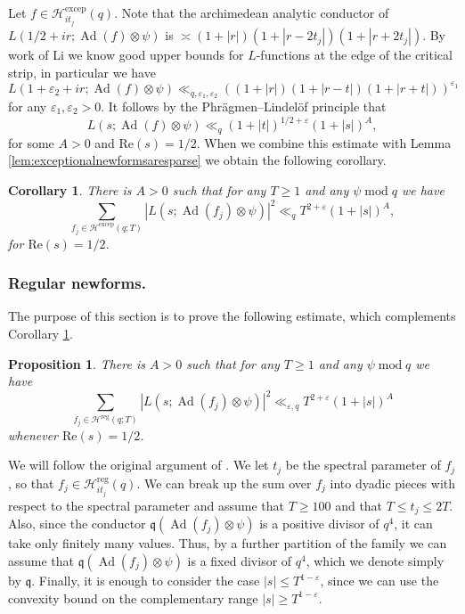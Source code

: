 \documentclass{article}
\newtheorem{prop}[thm]{Proposition}
\newtheorem{cor}[thm]{Corollary}
\theoremstyle{named}
\newcommand{\HH}{\mathcal{H}}
\newcommand{\q}{\mathfrak{q}}
\DeclareMathOperator{\Ad}{Ad}
\DeclareMathOperator{\modulo}{mod}
\begin{document}
Let $f \in \HH_{it_j}^{\text{excep}}(q)$. Note that the archimedean analytic conductor of $L(1/2 + ir; \Ad(f)\otimes \psi)$ is $\asymp (1 + |r|)(1 + |r - 2t_j|)(1 + |r + 2t_j|)$. By work of Li \cite{liupperboundedge} we know good upper bounds for $L$-functions at the edge of the critical strip, in particular we have
\begin{equation*}
    L(1 + \varepsilon_2 + ir; \Ad(f)\otimes \psi) \ll_{q, \varepsilon_1, \varepsilon_2} ((1 + |r|)(1 + |r - t|)(1 + |r + t|))^{\varepsilon_1}
\end{equation*}
for any $\varepsilon_1, \varepsilon_2 > 0$. It follows by the Phrägmen--Lindelöf principle that
\begin{equation*}
    L(s; \Ad(f)\otimes \psi) \ll_q (1 + |t|)^{1/2 + \varepsilon}(1 + |s|)^A,
\end{equation*}
for some $A > 0$ and $\text{Re}(s) = 1/2$. When we combine this estimate with Lemma \ref{lem:exceptionalnewformsaresparse} we obtain the following corollary.

\begin{cor}\label{cor:sumLfunctionsexceptional}
There is $A > 0$ such that for any $T \geq 1$ and any $\psi \modulo q$ we have
\begin{equation*}
    \sum_{f_j \in \HH^{\text{excep}}(q; T)} |L(s; \Ad(f_j)\otimes \psi)|^2 \ll_q T^{2 + \varepsilon} (1 + |s|)^A, 
\end{equation*}
for $\text{Re}(s) = 1/2$.
\end{cor}


\subsubsection{Regular newforms.}
The purpose of this section is to prove the following estimate, which complements Corollary \ref{cor:sumLfunctionsexceptional}. 
\begin{prop}\label{prop:lindelofforregularnewforms}
There is $A > 0$ such that for any $T \geq 1$ and any $\psi \modulo q$ we have
 \begin{equation*}
    \sum_{f_j \in \HH^{\text{reg}}(q; T)} |L(s; \Ad(f_j)\otimes \psi)|^2 \ll_{\varepsilon, q} T^{2+\varepsilon} (1 + |s|)^A
\end{equation*}
whenever $\text{Re}(s) = 1/2$.   
\end{prop}  
We will follow the original argument of \cite[Pages 220-221]{luosarnak}. We let $t_j$ be the spectral parameter of $f_j$, so that $f_j \in \HH^{\text{reg}}_{it_j}(q)$. We can break up the sum over $f_j$ into dyadic pieces with respect to the spectral parameter and assume that $T \geq 100$ and that $T \leq t_j \leq 2T$. Also, since the conductor $\q(\Ad(f_j) \otimes \psi)$ is a positive divisor of $q^4$, it can take only finitely many values. Thus, by a further partition of the family we can assume that $\q(\Ad(f_j) \otimes \psi)$ is a fixed divisor of $q^4$, which we denote simply by $\q$. Finally, it is enough to consider the case $|s| \leq T^{1-\varepsilon}$, since we can use the convexity bound on the complementary range $|s| \geq T^{1 - \varepsilon}$. 
\end{document}
